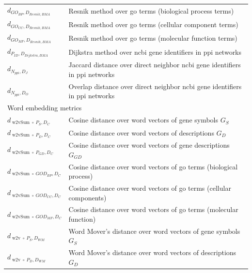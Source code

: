 \documentclass{thesisclass}
\DeclareMathOperator{\wToV}{w2v}
\DeclareMathOperator{\wToVSum}{w2vSum}
\begin{document}
\begin{table}[!ht]
\begin{tabularx}{\linewidth}{l|X}
		$\displaystyle d_{GO_{BP}, D_{Resnik,BMA}}$ & Resnik method over \acrshort{go} terms (biological process terms) \\
		$\displaystyle d_{GO_{CC}, D_{Resnik,BMA}}$ & Resnik method over \acrshort{go} terms (cellular component terms) \\
		$\displaystyle d_{GO_{MF}, D_{Resnik,BMA}}$ & Resnik method over \acrshort{go} terms (molecular function terms) \\
		\hline
		$\displaystyle d_{P_{ID}, D_{Dijkstra,BMA}}$ & Dijkstra method over \acrshort{ncbi} gene identifiers in \acrshort{ppi} networks \\
		$\displaystyle d_{N_{ppi}, D_J}$ & Jaccard distance over direct neighbor \acrshort{ncbi} gene identifiers in \acrshort{ppi} networks \\
		$\displaystyle d_{N_{ppi}, D_O}$ & Overlap distance over direct neighbor \acrshort{ncbi} gene identifiers in \acrshort{ppi} networks \\
		\hline
		\multicolumn{2}{l}{Word embedding metrics} \\
		\hline
		$\displaystyle d_{\wToVSum \circ\ P_{S},D_C}$ & Cosine distance over word vectors of gene symbols $G_S$  \\
		$\displaystyle d_{\wToVSum \circ\ P_{D}, D_C}$ & Cosine distance over word vectors of descriptions $G_D$  \\
		$\displaystyle d_{\wToVSum \circ\ P_{GD}, D_C}$ & Cosine distance over word vectors of gene descriptions $G_{GD}$  \\
		$\displaystyle d_{\wToVSum \circ\ GOD_{BP}, D_C}$ & Cosine distance over word vectors of \acrfull{go} terms (biological process)  \\
		$\displaystyle d_{\wToVSum \circ\ GOD_{CC}, D_C}$ & Cosine distance over word vectors of \acrfull{go} terms (cellular components) \\
		$\displaystyle d_{\wToVSum \circ\ GOD_{MF}, D_C}$ & Cosine distance over word vectors of \acrfull{go} terms (molecular function) \\
		$\displaystyle d_{\wToV \circ\ P_{S}, D_{WM}}$ & Word Mover's distance over word vectors of gene symbols $G_S$  \\
		$\displaystyle d_{\wToV \circ\ P_{D}, D_{WM}}$ & Word Mover's distance over word vectors of descriptions $G_D$  \\

\end{tabularx}
\end{table}
\end{document}
